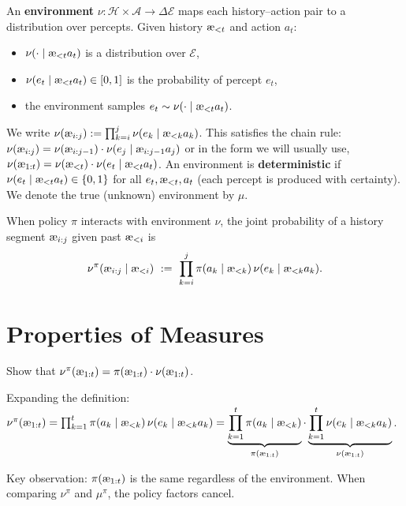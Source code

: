 \documentclass[fontsize=11pt, parskip=half]{scrartcl}
\newcommand{\cA}{\mathcal{A}}
\newcommand{\cE}{\mathcal{E}}
\newcommand{\cH}{\mathcal{H}}
\newcommand{\aes}{\textnormal{\ae}}
\begin{document}
\begin{definition}[Environment $\nu$]\label{def:environment}
An \textbf{environment} $\nu : \cH \times \cA \to \Delta \cE$ maps each history--action pair to a distribution over percepts. Given history $\aes_{<t}$ and action $a_t$:
\begin{itemize}\itemsep=2pt
    \item $\nu(\cdot \mid \aes_{<t} a_t)$ is a distribution over $\cE$,
    \item $\nu(e_t \mid \aes_{<t} a_t) \in [0,1]$ is the probability of percept $e_t$,
    \item the environment samples $e_t \sim \nu(\cdot \mid \aes_{<t} a_t)$.
\end{itemize}
We write $\nu(\aes_{i:j}) := \prod_{k=i}^j \nu(e_k \mid \aes_{<k} a_k)$.
This satisfies the chain rule: $\nu(\aes_{i:j}) = \nu(\aes_{i:j-1}) \cdot \nu(e_j \mid \aes_{i:j-1} a_j)$ or in the form we will usually use, $\nu(\aes_{1:t}) = \nu(\aes_{<t}) \cdot \nu(e_t \mid \aes_{<t} a_t)$.
An environment is \textbf{deterministic} if $\nu(e_t \mid \aes_{<t} a_t) \in \{0,1\}$ for all $e_t, \aes_{<t}, a_t$ (each percept is produced with certainty).
We denote the true (unknown) environment by $\mu$.
\end{definition}

\begin{definition}\label{def:interaction}
When policy $\pi$ interacts with environment $\nu$, the joint probability of a history segment $\aes_{i:j}$ given past $\aes_{<i}$ is
\[
    \nu^\pi(\aes_{i:j} \mid \aes_{<i})
    ~:=~ \prod_{k=i}^j \pi(a_k \mid \aes_{<k})\, \nu(e_k \mid \aes_{<k} a_k).
\]
\end{definition}


\setcounter{section}{-1}
\section{Properties of Measures}\label{prob:measures}

\begin{exercise}[Factorization]
\label{prob:factorization}
Show that $\nu^\pi(\aes_{1:t}) = \pi(\aes_{1:t}) \cdot \nu(\aes_{1:t})$.

\end{exercise}

\begin{solution}
Expanding the definition:
$\nu^\pi(\aes_{1:t})
= \prod_{k=1}^t \pi(a_k \mid \aes_{<k})\, \nu(e_k \mid \aes_{<k} a_k)
= \underbrace{\prod_{k=1}^t \pi(a_k \mid \aes_{<k})}_{\pi(\aes_{1:t})} \cdot \underbrace{\prod_{k=1}^t \nu(e_k \mid \aes_{<k} a_k)}_{\nu(\aes_{1:t})}$.

Key observation: $\pi(\aes_{1:t})$ is the same regardless of the environment. When comparing $\nu^\pi$ and $\mu^\pi$, the policy factors cancel.
\end{solution}
\end{document}
